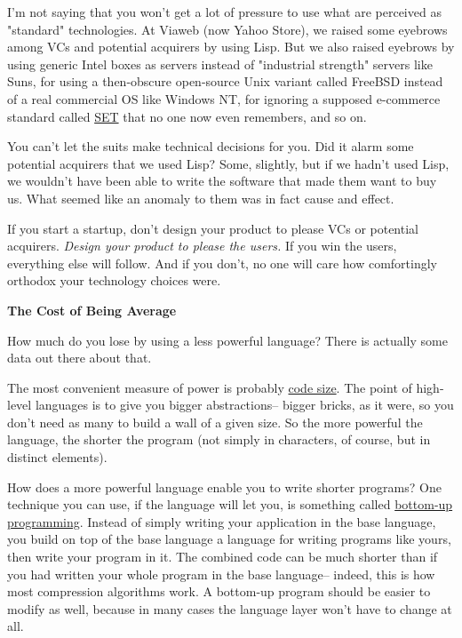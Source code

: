 I'm not saying that you won't get a lot of
                  pressure to use what are perceived as "standard" technologies.
                  At Viaweb (now Yahoo Store), we raised some eyebrows among VCs
                  and potential acquirers by using Lisp. But we also raised
                  eyebrows by using generic Intel boxes as servers instead of
                  "industrial strength" servers like Suns, for using a
                  then-obscure open-source Unix variant called FreeBSD instead
                  of a real commercial OS like Windows NT, for ignoring a
                  supposed e-commerce standard called
                  \href{http://news.com.com/2100-1017-225723.html}{SET}
                  that no one now even remembers, and so on.

You
                  can't let the suits make technical decisions for you. Did it
                  alarm some potential acquirers that we used Lisp? Some,
                  slightly, but if we hadn't used Lisp, we wouldn't have been
                  able to write the software that made them want to buy us. What
                  seemed like an anomaly to them was in fact cause and
                  effect.

If you start a startup, don't design your
                  product to please VCs or potential acquirers.
                  \emph{Design your product to please the users.} If you win the
                  users, everything else will follow. And if you don't, no one
                  will care how comfortingly orthodox your technology choices
                  were.

\textbf{The Cost of Being Average}

How much do you lose by using a less powerful
                  language? There is actually some data out there about that.

The
                  most convenient measure of power is probably
                  \href{http://www.paulgraham.com/power.html}{code size}. The point of high-level
                  languages is to give you bigger abstractions-- bigger bricks,
                  as it were, so you don't need as many to build a wall of a
                  given size. So the more powerful the language, the shorter the
                  program (not simply in characters, of course, but in distinct
                  elements).

How does a more powerful language enable
                  you to write shorter programs? One technique you can use, if
                  the language will let you, is something called
                  \href{http://www.paulgraham.com/progbot.html}{bottom-up programming}. Instead of
                  simply writing your application in the base language, you
                  build on top of the base language a language for writing
                  programs like yours, then write your program in it. The
                  combined code can be much shorter than if you had written your
                  whole program in the base language-- indeed, this is how most
                  compression algorithms work. A bottom-up program should be
                  easier to modify as well, because in many cases the language
                  layer won't have to change at all.

